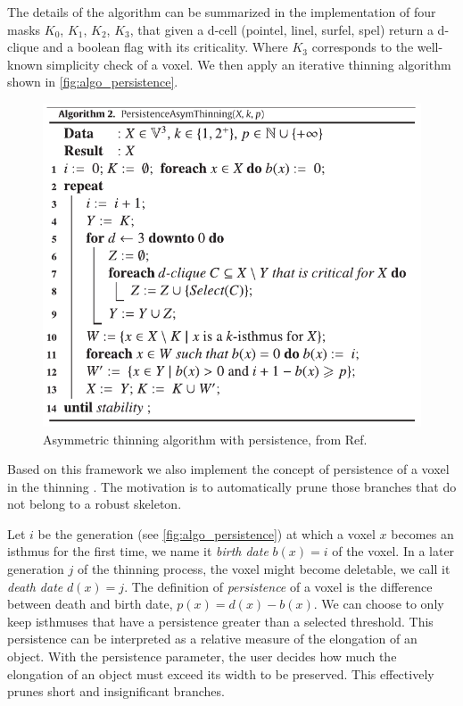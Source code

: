 The details of the algorithm can be summarized in the implementation of four masks
$K_0$, $K_1$, $K_2$, $ K_3$, that given a d-cell (pointel, linel, surfel, spel) return a d-clique and a boolean flag with its criticality. Where $K_3$ corresponds to the well-known simplicity check of a voxel. We then apply an iterative thinning algorithm shown in \autoref{fig:algo_persistence}.

\begin{figure}[!htb]
  \centering
  \includegraphics[width=0.8\linewidth]{Figures/chapter-image/dgtal/voxelComplexAlgoPersistence.png}
  \caption{Asymmetric thinning algorithm with persistence, from Ref.~\cite{couprie_asymmetric_2016}}
  \label{fig:algo_persistence}
\end{figure}

Based on this framework we also implement the concept of persistence of a voxel in the thinning \cite{couprie_asymmetric_2016}. The motivation is to automatically prune those branches that do not belong to a robust skeleton.

Let $i$ be the generation (see \autoref{fig:algo_persistence}) at which a voxel $x$ becomes an isthmus for the first time, we name it \textit{birth date} $b(x) = i$ of the voxel. In a later generation $j$ of the thinning process, the voxel might become deletable, we call it \textit{death date} $d(x) = j$.
The definition of \textit{persistence} of a voxel is the difference between death and birth date, $p(x) = d(x) - b(x)$.
We can choose to only keep isthmuses that have a persistence greater than a selected threshold. This persistence can be interpreted as a relative measure of the elongation of an object. With the persistence parameter, the user decides how much the elongation of an object must exceed its width to be preserved. This effectively prunes short and insignificant branches.

